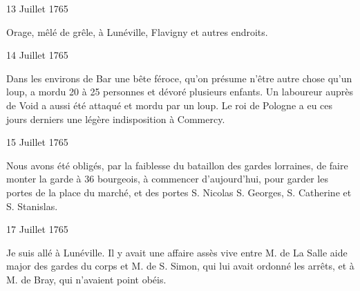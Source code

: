                      \begin{diary}{13 Juillet 1765}{}
                        
                         Orage, mêlé de grêle, à Lunéville, Flavigny
                           et autres endroits. \bigskip
        
        
                     \end{diary}

                     \begin{diary}{14 Juillet 1765}{}
                        
                         Dans les environs de Bar une bête féroce,
                           qu'on présume n'être autre chose qu'un loup,
                           a mordu 20 à 25 personnes et dévoré
                           plusieurs enfants. Un laboureur auprès de
                               Void a aussi été attaqué et mordu par
                           un loup. Le roi de Pologne a eu ces jours
                           derniers une légère indisposition à Commercy. \bigskip
        
        
                     \end{diary}

                     \begin{diary}{15 Juillet 1765}{}
                        
                         Nous avons été obligés, par la
                           faiblesse
                           du bataillon des gardes lorraines, de faire monter
                           la garde à 36 bourgeois, à commencer
                           d'aujourd'hui, pour garder les portes de la
                              place du marché, et des portes S. Nicolas
                           S. Georges,
                              S.
                              Catherine et S. Stanislas. \bigskip
        
        
                     \end{diary}

                     \begin{diary}{17 Juillet 1765}{}
                        
                         Je suis allé à Lunéville. Il y avait une affaire assès vive entre M. de La Salle aide major
                           des gardes du corps et M. de S.
                              Simon, qui
                           lui avait ordonné les arrêts, et à M. de
                              Bray, qui n'avaient point obéis. \bigskip
        
        
                     \end{diary}

